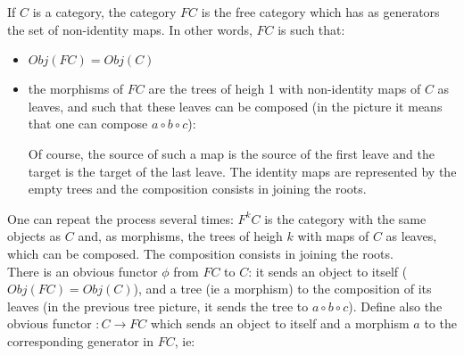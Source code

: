 \begin{defin}
If $C$ is a category, the category $FC$ is the free category which has as generators the set of non-identity maps. In other words, $FC$ is such that:
\begin{itemize}
\item $Obj(FC)=Obj(C)$
\item the morphisms of $FC$ are the trees of heigh 1 with non-identity maps of $C$ as leaves, and such that these leaves can be composed (in the picture it means that one can compose $a \circ b \circ c$):\\
\begin{center}
\end{center}
Of course, the source of such a map is the source of the first leave and the target is the target of the last leave. The identity maps are represented by the empty trees and the composition consists in joining the roots.
\end{itemize}
\end{defin}

One can repeat the process several times: $F^kC$ is the category with the same objects as $C$ and, as morphisms, the trees of heigh $k$ with maps of $C$ as leaves, which can be composed. The composition consists in joining the roots.\\

There is an obvious functor $\phi$ from $FC$ to $C$: it sends an object to itself ($Obj(FC)=Obj(C)$), and a tree (ie a morphism) to the composition of its leaves (in the previous tree picture, it sends the tree to $a \circ b \circ c$). Define also the obvious functor $:C \rightarrow FC$ which sends an object to itself and a morphism $a$ to the corresponding generator in $FC$, ie:
\begin{center}
\end{center}  


